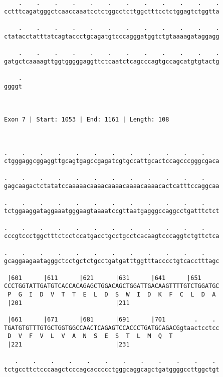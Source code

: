 \documentclass{article}
\begin{document}
\begin{Verbatim}
    .    .    .    .    .    .    .    .    .    .    .    .
cctttcagatgggctcaaccaaatcctctggcctcttggctttcctctggagtctggtta
                                                            
    .    .    .    .    .    .    .    .    .    .    .    .
ctatacctatttatcagtaccctgcagatgtcccagggatggtctgtaaaagataggagg
                                                            
    .    .    .    .    .    .    .    .    .    .    .    .
gatgctcaaaagttggtgggggaggttctcaatctcagcccagtgccagcatgtgtactg
                                                            
    .
ggggt
     
     
 
Exon 7 | Start: 1053 | End: 1161 | Length: 108



.    .    .    .    .    .    .    .    .    .    .    .    
ctgggaggcggaggttgcagtgagccgagatcgtgccattgcactccagcccgggcgaca
                                                            
.    .    .    .    .    .    .    .    .    .    .    .    
gagcaagactctatatccaaaaacaaaacaaaacaaaacaaaacactcatttccaggcaa
                                                            
.    .    .    .    .    .    .    .    .    .    .    .    
tctggaaggataggaaatgggaagtaaaatccgttaatgagggccaggcctgatttctct
                                                            
.    .    .    .    .    .    .    .    .    .    .    .    
cccgtccctggctttctcctccatgacctgcctgcctcacaagtcccaggtctgttctca
                                                            
.    .    .    .    .    .    .    .    .    .    .    .    
gcaggaagaatagggctcctgctctgcctgatgatttggtttacccctgtcacctttagc
                                                            
 |601      |611      |621      |631      |641      |651     
CCCTGGTATTGATGTCACCACAGAGCTGGACAGCTGGATTGACAAGTTTTGTCTGGATGC
 P  G  I  D  V  T  T  E  L  D  S  W  I  D  K  F  C  L  D  A 
 |201                          |211                         
  
 |661      |671      |681      |691      |701        .    . 
TGATGTGTTTGTGCTGGTGGCCAACTCAGAGTCCACCCTGATGCAGACGgtaactcctcc
 D  V  F  V  L  V  A  N  S  E  S  T  L  M  Q  T             
 |221                          |231                         
  
   .    .    .    .    .    .    .    .    .    .    .    . 
tctgccttctcccaagctcccagcaccccctgggcaggcagctgatggggccttggctgt
                                                            

\end{Verbatim}
\end{document}
